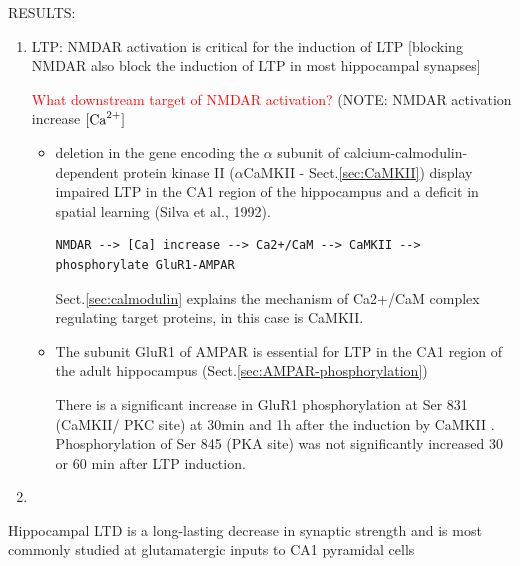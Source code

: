 RESULTS:
\begin{enumerate}
  \item LTP: NMDAR activation is critical for the induction of LTP
  [blocking NMDAR also block the induction of LTP in most hippocampal synapses]

\textcolor{red}{What downstream target of NMDAR activation?} (NOTE: NMDAR
activation increase $[{\text{Ca}^{2+}}]$
\begin{itemize}
  
  \item  deletion in the gene encoding the $\alpha$ subunit of
  calcium-calmodulin-dependent protein kinase II ($\alpha$CaMKII -
  Sect.\ref{sec:CaMKII}) display impaired LTP in the CA1 region of the hippocampus
  and a deficit in spatial learning (Silva et al., 1992).
  
\begin{verbatim}
NMDAR --> [Ca] increase --> Ca2+/CaM --> CaMKII --> phosphorylate GluR1-AMPAR
\end{verbatim}
Sect.\ref{sec:calmodulin} explains the mechanism of Ca2+/CaM complex regulating
target proteins, in this case is CaMKII.
  
%  
   
   \item The subunit GluR1 of AMPAR is essential for LTP in the CA1 region of
   the adult hippocampus (Sect.\ref{sec:AMPAR-phosphorylation}) 
   
   There is a significant increase in GluR1 phosphorylation at Ser 831 (CaMKII/
PKC site) at 30min and 1h after the induction by CaMKII \citep{lee2000pab}.
Phosphorylation of Ser 845 (PKA site) was not significantly increased 30 or 60
min after LTP induction.

\end{itemize}


  \item 
\end{enumerate}


Hippocampal LTD is a long-lasting decrease in synaptic strength and is most
commonly studied at glutamatergic inputs to CA1 pyramidal cells

